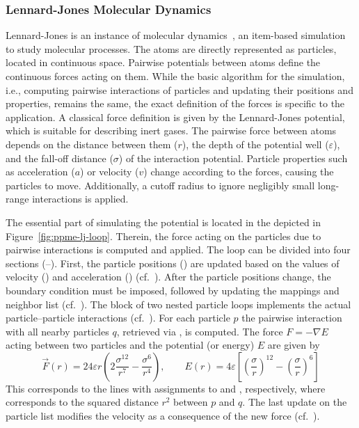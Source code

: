 \subsubsection{Lennard-Jones Molecular Dynamics} %
\label{par:lennard_jones_potential}
  Lennard-Jones is an instance of
  molecular dynamics~\cite{Frenkel2001}, an item-based simulation to study molecular 
  processes. The atoms are directly represented as particles,
  located in continuous space. Pairwise potentials between atoms define the
  continuous forces acting on them. While the basic algorithm for the simulation,
  i.e., computing pairwise interactions of particles and updating their positions
  and properties, remains the same, the exact definition of the forces is specific to
  the application. A classical force definition is given by the Lennard-Jones potential, which is suitable for describing inert gases. 
  The pairwise force between 
  atoms depends on the distance between them ($r$), the depth of the potential well
  ($\varepsilon$), and the fall-off distance ($\sigma$) of the interaction potential. Particle properties such as
  acceleration ($a$) or velocity ($v$) change according to the forces, 
  causing the particles to move. Additionally, a cutoff radius to ignore negligibly small
  long-range interactions is applied.
  
  The essential part of simulating the potential is located in the 
  depicted in Figure~\ref{fig:ppme-lj-loop}. Therein, the force acting on the
  particles due to pairwise interactions is computed and applied. The loop can be
  divided into four sections (--). First, the particle positions () are
  updated based on the values of velocity () and acceleration
  () (cf.~). After the particle positions change, the boundary
  condition must be imposed, followed by updating the mappings and neighbor list (cf.~). 
  The block of two nested particle loops implements the actual particle--particle 
  interactions (cf.~). For each particle $p$ the pairwise interaction with all nearby 
  particles $q$, retrieved via , is computed. The force
  $F=-\nabla E$ acting between two particles and the potential (or energy) $E$ are given by
  \begin{equation} \vec{F}(r) = 24 \varepsilon r \left( 2 \frac{\sigma^{12}}{r^7} -
  \frac{\sigma^6}{r^4}\right) , \qquad E(r) = 4 \varepsilon \left[ {\left(
  \frac{\sigma}{r}\right)}^{12} - {\left( \frac{\sigma}{r} \right)}^{6} \right]
  \end{equation}%
  This corresponds to the lines with assignments to 
  and , respectively, where  corresponds 
  to the squared distance $r^2$ between $p$ and $q$.
  The last update on the particle list modifies the
  velocity as a consequence of the new force (cf.~).

